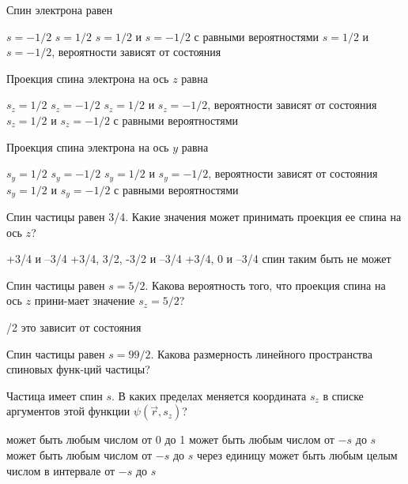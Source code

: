 \documentclass[11pt,a4paper]{exam}
\begin{document}
\begin{questions}

\question Спин электрона равен 
\begin{choices}
\choice $s =  - 1/2$
\choice $s = 1/2$
\choice $s = 1/2$ и $s =  - 1/2$ с равными вероятностями
\choice $s = 1/2$ и $s =  - 1/2$, вероятности зависят от состояния
\end{choices}

\question Проекция спина электрона на ось $z$ равна 
\begin{choices}
\choice ${s_z} = 1/2$
\choice ${s_z} =  - 1/2$
\choice ${s_z} = 1/2$ и ${s_z} =  - 1/2$, вероятности зависят от состояния 
\choice ${s_z} = 1/2$ и ${s_z} =  - 1/2$ с равными вероятностями
\end{choices}

\question Проекция спина электрона на ось $y$ равна 
\begin{choices}
\choice ${s_y} = 1/2$
\choice ${s_y} =  - 1/2$
\choice ${s_y} = 1/2$ и ${s_y} =  - 1/2$, вероятности зависят от состояния
\choice ${s_y} = 1/2$ и ${s_y} =  - 1/2$ с равными вероятностями
\end{choices}

\question Спин частицы равен 3/4. Какие значения может принимать проекция ее спина на ось $z$?
\begin{choices}
\choice +3/4 и –3/4       
\choice +3/4, 3/2, -3/2 и –3/4
\choice +3/4, 0 и –3/4       
\choice спин таким быть не может 
\end{choices}

\question Спин частицы равен $s = 5/2$. Какова вероятность того, что проекция спина на ось $z$ прини-мает значение ${s_z} = 5/2$?
\begin{choices}
/2     
\choice это зависит от состояния
\end{choices}

\question Спин частицы равен $s = 99/2$. Какова размерность линейного пространства спиновых функ-ций частицы?
\begin{choices}
\end{choices}

\question Частица имеет спин $s$. В каких пределах меняется координата ${s_z}$ в списке аргументов этой функции $\psi (\vec r,{s_z})$? 
\begin{choices}
\choice может быть любым числом от 0 до 1
\choice может быть любым числом от $ - s$ до $s$
\choice может быть любым числом от $ - s$ до $s$ через единицу
\choice может быть любым целым числом в интервале от $ - s$ до $s$
\end{choices}


\end{questions}
\end{document}
